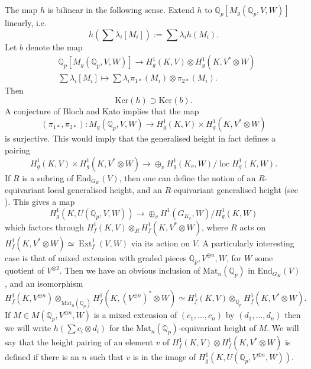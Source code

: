 \documentclass[11pt]{amsart}
\def\Q{\mathbb Q}
\newcommand{\End}{\mathrm{End}}
\newcommand{\Mat}{\mathrm{Mat}}
\theoremstyle{plain}
\newtheorem{conjecture}{Conjecture}
\theoremstyle{definition}
\DeclareMathOperator{\loc}{loc}
\newcommand{\Ker}{\mathrm{Ker}}
\newcommand{\Hom}{\mathrm{Hom}}
\DeclareMathOperator{\ext}{Ext}
\begin{document}
The map $h$ is bilinear in the following sense. Extend $h$ to $\Q _p [M_g (\Q _p ,V,W)]$ linearly, i.e.
\[
h(\sum \lambda _i [M_i ]):=\sum \lambda _i h(M_i ).
\]
Let $b$ denote the map
\begin{align*}
& \Q _p [M_g (\Q _p ,V,W)]\to H^1 _g (K,V)\otimes H^1 _g (K,V^* \otimes W) \\
& \sum \lambda _i [M_i ]\mapsto \sum \lambda _i \pi _{1 *}(M_i )\otimes \pi _{2*}(M_i ).
\end{align*}
Then 
\[
\Ker (h)\supset \Ker (b).
\]
A conjecture of Bloch and Kato \cite{BK} implies that the map
\[
(\pi _{1 *},\pi _{2*}):M_g (\Q _p  ,V,W)\to H^1 _g (K  ,V)\times H^1 _g (K ,V^* \otimes W)
\]
is surjective. This would imply that the generalised height in fact defines a pairing
\[
H^1 _g (K ,V)\times H^1 _g (K ,V^* \otimes W)\to \oplus _v H^1 _g (K _v ,W)/\loc H^1 _g (K ,W).
\]
If $R$ is a subring of $\End _{G_K }(V)$, then one can define the notion of an $R$-equivariant local generalised height, and an $R$-equivariant generalised height (see \cite[4.1]{QC2}). This gives a map
\[
H^1 _g (K,U(\Q _p ,V,W))\to \oplus _v H^1 (G_{K_v },W)/H^1 _g (K,W)
\]
which factors through $H^1 _f (K,V)\otimes _R H^1 _f (K,V^* \otimes W)$, where $R$ acts on $H^1 _f (K,V^* \otimes W)\simeq \ext ^1 _f (V,W)$ via its action on $V$. A particularly interesting case is that of mixed extension with graded pieces $\Q _p ,V^{\oplus n},W$, for $W$ some quotient of $V^{\otimes 2}$. Then we have an obvious inclusion of $\Mat _n (\Q _p )$ in $\End _{G_K }(V)$, and an isomorphism
\[
H^1 _f (K,V^{\oplus n})\otimes _{\Mat _n (\Q _p )}H^1 _f (K,(V^{\oplus n})^* \otimes W)\simeq H^1 _f (K,V)\otimes _{\Q _p }H^1 _f (K,V^* \otimes W).
\]
If $M\in M(\Q _p ,V^{\oplus n},W)$ is a mixed extension of $(c_1 ,\ldots ,c_n )$ by $(d_1 ,\ldots ,d_n )$ then we will write $h(\sum c_i \otimes d_i )$ for the $\Mat _n (\Q _p )$-equivariant height of $M$. We will say that the height pairing of an element $v$ of $H^1 _f (K,V)\otimes H^1 _f (K,V^* \otimes W)$ is defined if there is an $n$ such that $v$ is in the image of $H^1 _g (K,U(\Q _p ,V^{\oplus n},W))$.
\end{document}
